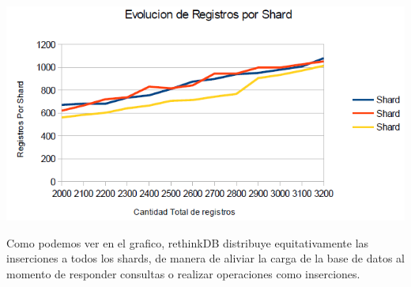 \includegraphics[scale=0.75]{Shards.png}

Como podemos ver en el grafico, rethinkDB distribuye equitativamente las inserciones a todos los shards, de manera de aliviar la carga de la base de datos al momento de responder consultas o realizar operaciones como inserciones.

